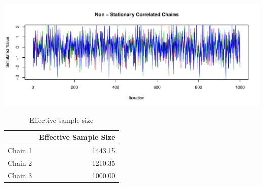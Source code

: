 \documentclass[12pt]{article}\usepackage[]{graphicx}\usepackage[]{color}
\newenvironment{knitrout}{}{} %
\begin{document}
\begin{knitrout}
\color{fgcolor}

{\centering \includegraphics[width=\linewidth]{figure/plots-1} 

}



\end{knitrout}

\begin{table}[H]
\centering
\caption{Effective sample size} 
\begin{tabular}{rr}
  \hline
 & Effective Sample Size \\ 
  \hline
Chain 1 & 1443.15 \\ 
  Chain 2 & 1210.35 \\ 
  Chain 3 & 1000.00 \\ 
   \hline
\end{tabular}
\end{table}
\end{document}
